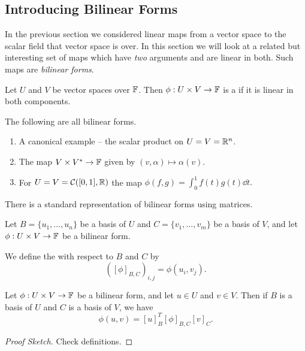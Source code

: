 \documentclass[a4paper]{scrartcl}
\begin{document}
\subsection{Introducing Bilinear Forms}

In the previous section we considered linear maps from a vector space to the scalar field that vector space is over. In this section we will look at a related but interesting set of maps which have \emph{two} arguments and are linear in both.
Such maps are \emph{bilinear forms}.

\begin{definition}
    Let $U$ and $V$ be vector spaces over $\mathbb{F}$. Then $\phi: U \times V \rightarrow \mathbb{F}$ is a  if it is linear in both components.
\end{definition}

\begin{example}
    The following are all bilinear forms.
    \begin{enumerate}[label=(\roman*)]
        \item A canonical example -- the scalar product on $U = V = \mathbb{R}^n$.
        \item The map $V \times V^* \rightarrow \mathbb{F}$ given by $(v, \alpha) \mapsto \alpha(v)$.
        \item For $U = V = \mathcal{C}([0, 1],\mathbb{R})$ the map
        $
        \phi(f, g) = \int_0^1 f(t) g(t) \dd t.
        $
    \end{enumerate}
\end{example}

There is a standard representation of bilinear forms using matrices.

\begin{definition}
    Let $B = \{u_1, \dots, u_n\}$ be a basis of $U$ and $C = \{v_1, \dots, v_m\}$ be a basis of $V$, and let $\phi: U \times V \rightarrow \mathbb{F}$ be a bilinear form.
    
    We define the  with respect to $B$ and $C$ by
    $$
    ([\phi]_{B, C})_{i, j} = \phi(u_i, v_j). 
    $$
\end{definition}

\begin{lemma}
    Let $\phi: U \times V \rightarrow \mathbb{F}$ be a bilinear form, and let $u \in U$ and $v \in V$. Then if $B$ is a basis of $U$ and $C$ is a basis of $V$, we have
    $$
    \phi(u, v) = [u]_B^T [\phi]_{B, C} [v]_C.
    $$
\end{lemma}
\begin{proof}[Proof Sketch]
    Check definitions.
\end{proof}
\end{document}

